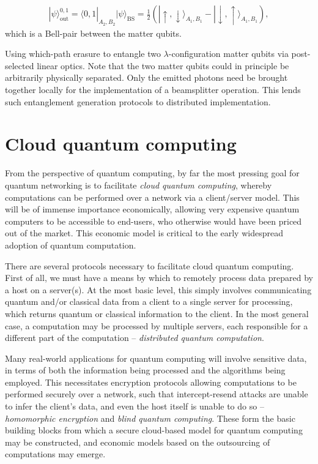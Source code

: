 \documentclass[aps, rmp, twocolumn, amsmath, amssymb, nofootinbib, superscriptaddress, longbibliography, floatfix, table-of-contents, eqsecnum]{revtex4-1}
\newcommand{\bra}[1]{\langle#1|}
\newcommand{\ket}[1]{|#1\rangle}
\begin{document}
\begin{table}[!htb]
{{{\begin{enumerate}
\begin{align}
\ket\psi_\text{out}^{0,1} = \bra{0,1}_{A_2,B_2} \ket\psi_\text{BS} = \frac{1}{2} (\ket{\!\uparrow,\downarrow}_{A_1,B_1} - \ket{\!\downarrow,\uparrow}_{A_1,B_1}),
\end{align}
which is a Bell-pair between the matter qubits.
\end{enumerate}}}}
\caption{Using which-path erasure to entangle two $\lambda$-configuration matter qubits via post-selected linear optics. Note that the two matter qubits could in principle be arbitrarily physically separated. Only the emitted photons need be brought together locally for the implementation of a beamsplitter operation. This lends such entanglement generation protocols to distributed implementation.} \label{alg:which_path}
\end{table}

%
%

\section{Cloud quantum computing} \label{sec:cloud} 

From the perspective of quantum computing, by far the most pressing goal for quantum networking is to facilitate \textit{cloud quantum computing}, whereby computations can be performed over a network via a client/server model. This will be of immense importance economically, allowing very expensive quantum computers to be accessible to end-users, who otherwise would have been priced out of the market. This economic model is critical to the early widespread adoption of quantum computation.

There are several protocols necessary to facilitate cloud quantum computing. First of all, we must have a means by which to remotely process data prepared by a host on a server(s). At the most basic level, this simply involves communicating quantum and/or classical data from a client to a single server for processing, which returns quantum or classical information to the client. In the most general case, a computation may be processed by multiple servers, each responsible for a different part of the computation -- \textit{distributed quantum computation}.

Many real-world applications for quantum computing will involve sensitive data, in terms of both the information being processed and the algorithms being employed. This necessitates encryption protocols allowing computations to be performed securely over a network, such that intercept-resend attacks are unable to infer the client's data, and even the host itself is unable to do so -- \textit{homomorphic encryption} and \textit{blind quantum computing}. These form the basic building blocks from which a secure cloud-based model for quantum computing may be constructed, and economic models based on the outsourcing of computations may emerge.
\end{document}
